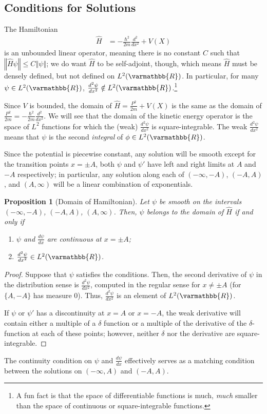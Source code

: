 \documentclass[12pt]{extarticle}
\newcommand{\R}{\varmathbb{R}}
\newcommand{\norm}[1]{\left\Vert #1\right\Vert}
\theoremstyle{plain}
\newtheorem*{proposition}{Proposition}%
\theoremstyle{definition}
\theoremstyle{remark}
\renewcommand{\newline}{\hfill\break}
\begin{document}
  \subsection{Conditions for Solutions}%
  The Hamiltonian
  \begin{align*}
    \hat{H} &= -\frac{\hbar^2}{2m} \frac{d ^2}{d x^2} + V(X)
  \end{align*}
  is an unbounded linear operator, meaning there is no constant $C$ such that $\norm{\hat{H}\psi} \leq C\norm{\psi}$; we do want $\hat{H}$ to be self-adjoint, though, which means $\hat{H}$ must be densely defined, but not defined on $L^{2}(\R)$. In particular, for many $\psi \in L^{2}(\R)$, $\frac{d ^2\psi}{d x^2}\notin L^{2}(\R)$.\footnote{A fun fact is that the space of differentiable functions is much, \textit{much} smaller than the space of continuous or square-integrable functions.}\newline

  Since $V$ is bounded, the domain of $\hat{H} = \frac{P^2}{2m} + V(X)$ is the same as the domain of $\frac{P^2}{2m} = -\frac{\hbar^2}{2m}\frac{d ^2}{d x^2}$. We will see that the domain of the kinetic energy operator is the space of $L^{2}$ functions for which the (weak) $\frac{d ^2\psi}{d x^2}$ is square-integrable. The weak $\frac{d ^2\psi}{d x^2}$ means that $\psi$ is the second \textit{integral} of $\phi\in L^{2}(\R)$.\newline

  Since the potential is piecewise constant, any solution will be smooth except for the transition points $x = \pm A$, both $\psi$ and $\psi'$ have left and right limits at $A$ and $-A$ respectively; in particular, any solution along each of $(-\infty,-A)$, $(-A,A)$, and $(A,\infty)$ will be a linear combination of exponentials.
  \begin{proposition}[Domain of Hamiltonian]
    Let $\psi$ be smooth on the intervals $(-\infty,-A)$, $(-A,A)$, $(A,\infty)$. Then, $\psi$ belongs to the domain of $\hat{H}$ if and only if
    \begin{enumerate}[(1)]
      \item $\psi$ and $\frac{d \psi}{d x}$ are continuous at $x = \pm A$;
      \item $\frac{d ^2\psi}{d x^2}\in L^{2}(\R)$.
    \end{enumerate}
  \end{proposition}
  \begin{proof}
    Suppose that $\psi$ satisfies the conditions. Then, the second derivative of $\psi$ in the distribution sense is $\frac{d ^2\psi}{d x^2}$, computed in the regular sense for $x\neq \pm A$ (for $\{A,-A\}$ has measure $0$). Thus, $\frac{d ^2\psi}{d x^2}$ is an element of $L^{2}(\R)$.\newline

    If $\psi$ or $\psi'$ has a discontinuity at $x=A$ or $x=-A$, the weak derivative will contain either a multiple of a $\delta$ function or a multiple of the derivative of the $\delta$-function at each of these points; however, neither $\delta$ nor the derivative are square-integrable.
  \end{proof}
  The continuity condition on $\psi$ and $\frac{d \psi}{d x}$ effectively serves as a matching condition between the solutions on $(-\infty,A)$ and $(-A,A)$.
\end{document}
